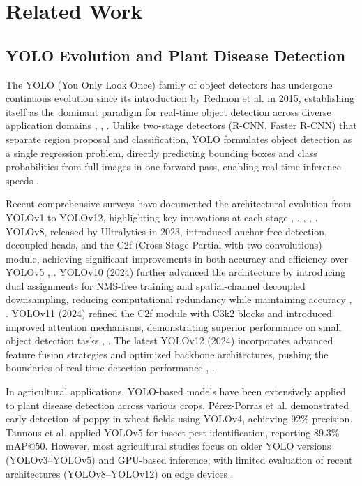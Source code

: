 \section{Related Work}

\subsection{YOLO Evolution and Plant Disease Detection}

The YOLO (You Only Look Once) family of object detectors has undergone continuous evolution since its introduction by Redmon et al. in 2015, establishing itself as the dominant paradigm for real-time object detection across diverse application domains \cite{17}, \cite{21}, \cite{29}. Unlike two-stage detectors (R-CNN, Faster R-CNN) that separate region proposal and classification, YOLO formulates object detection as a single regression problem, directly predicting bounding boxes and class probabilities from full images in one forward pass, enabling real-time inference speeds \cite{1}.

Recent comprehensive surveys have documented the architectural evolution from YOLOv1 to YOLOv12, highlighting key innovations at each stage \cite{30}, \cite{31}, \cite{32}, \cite{33}, \cite{34}. YOLOv8, released by Ultralytics in 2023, introduced anchor-free detection, decoupled heads, and the C2f (Cross-Stage Partial with two convolutions) module, achieving significant improvements in both accuracy and efficiency over YOLOv5 \cite{14}, \cite{29}. YOLOv10 (2024) further advanced the architecture by introducing dual assignments for NMS-free training and spatial-channel decoupled downsampling, reducing computational redundancy while maintaining accuracy \cite{21}, \cite{33}. YOLOv11 (2024) refined the C2f module with C3k2 blocks and introduced improved attention mechanisms, demonstrating superior performance on small object detection tasks \cite{4}, \cite{25}. The latest YOLOv12 (2024) incorporates advanced feature fusion strategies and optimized backbone architectures, pushing the boundaries of real-time detection performance \cite{24}, \cite{31}.

In agricultural applications, YOLO-based models have been extensively applied to plant disease detection across various crops. Pérez-Porras et al. \cite{26} demonstrated early detection of poppy in wheat fields using YOLOv4, achieving 92\% precision. Tannous et al. \cite{27} applied YOLOv5 for insect pest identification, reporting 89.3\% mAP@50. However, most agricultural studies focus on older YOLO versions (YOLOv3--YOLOv5) and GPU-based inference, with limited evaluation of recent architectures (YOLOv8--YOLOv12) on edge devices \cite{35}.

